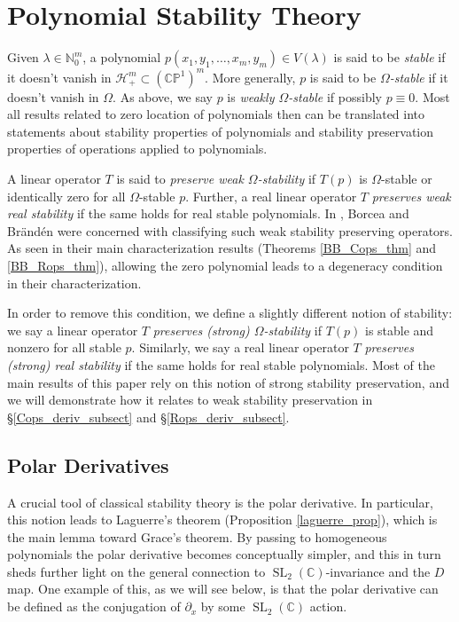 \documentclass{article}
\theoremstyle{definition}
\theoremstyle{plain}
\newcommand{\C}{\mathbb{C}}
\newcommand{\N}{\mathbb{N}}
\newcommand{\CP}{\mathbb{CP}}
\newcommand{\UHP}{\mathcal{H}_+}
\DeclareMathOperator{\SL}{SL}
\begin{document}
\section{Polynomial Stability Theory}\label{stability_sect}

Given $\lambda \in \N_0^m$, a polynomial $p(x_1,y_1,\ldots,x_m,y_m) \in V(\lambda)$ is said to be \emph{stable} if it doesn't vanish in $\UHP^m \subset (\CP^1)^m$. More generally, $p$ is said to be \emph{$\Omega$-stable} if it doesn't vanish in $\Omega$. As above, we say $p$ is \emph{weakly $\Omega$-stable} if possibly $p \equiv 0$. Most all results related to zero location of polynomials then can be translated into statements about stability properties of polynomials and stability preservation properties of operations applied to polynomials.

A linear operator $T$ is said to \emph{preserve weak $\Omega$-stability} if $T(p)$ is $\Omega$-stable or identically zero for all $\Omega$-stable $p$. Further, a real linear operator $T$ \emph{preserves weak real stability} if the same holds for real stable polynomials. In \cite{bb1}, Borcea and Br{\"a}nd{\'e}n were concerned with classifying such weak stability preserving operators. As seen in their main characterization results (Theorems \ref{BB_Cops_thm} and \ref{BB_Rops_thm}), allowing the zero polynomial leads to a degeneracy condition in their characterization.

In order to remove this condition, we define a slightly different notion of stability: we say a linear operator $T$ \emph{preserves (strong) $\Omega$-stability} if $T(p)$ is stable and nonzero for all stable $p$. Similarly, we say a real linear operator $T$ \emph{preserves (strong) real stability} if the same holds for real stable polynomials. Most of the main results of this paper rely on this notion of strong stability preservation, and we will demonstrate how it relates to weak stability preservation in \S\ref{Cops_deriv_subsect} and \S\ref{Rops_deriv_subsect}.

\subsection{Polar Derivatives}

A crucial tool of classical stability theory is the polar derivative. In particular, this notion leads to Laguerre's theorem (Proposition \ref{laguerre_prop}), which is the main lemma toward Grace's theorem. By passing to homogeneous polynomials the polar derivative becomes conceptually simpler, and this in turn sheds further light on the general connection to $\SL_2(\C)$-invariance and the $D$ map. One example of this, as we will see below, is that the polar derivative can be defined as the conjugation of $\partial_x$ by some $\SL_2(\C)$ action.
\end{document}
